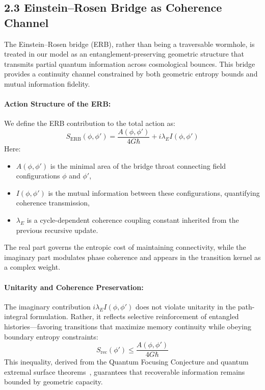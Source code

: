 \subsection*{2.3 Einstein–Rosen Bridge as Coherence Channel}

The Einstein–Rosen bridge (ERB), rather than being a traversable wormhole, is treated in our model as an entanglement-preserving geometric structure that transmits partial quantum information across cosmological bounces. This bridge provides a continuity channel constrained by both geometric entropy bounds and mutual information fidelity.

\paragraph{Action Structure of the ERB:}

We define the ERB contribution to the total action as:
\begin{equation}
S_{\text{ERB}}(\phi, \phi') = \frac{A(\phi, \phi')}{4G\hbar} + i \lambda_E I(\phi, \phi')
\end{equation}
Here:
\begin{itemize}
    \item \( A(\phi, \phi') \) is the minimal area of the bridge throat connecting field configurations \( \phi \) and \( \phi' \),
    \item \( I(\phi, \phi') \) is the mutual information between these configurations, quantifying coherence transmission,
    \item \( \lambda_E \) is a cycle-dependent coherence coupling constant inherited from the previous recursive update.
\end{itemize}

The real part governs the entropic cost of maintaining connectivity, while the imaginary part modulates phase coherence and appears in the transition kernel as a complex weight.

\paragraph{Unitarity and Coherence Preservation:}

The imaginary contribution \( i \lambda_E I(\phi, \phi') \) does not violate unitarity in the path-integral formulation. Rather, it reflects selective reinforcement of entangled histories—favoring transitions that maximize memory continuity while obeying boundary entropy constraints:
\[
S_{\text{rec}}(\phi') \leq \frac{A(\phi, \phi')}{4G\hbar}
\]
This inequality, derived from the Quantum Focusing Conjecture and quantum extremal surface theorems~\cite{engelhardt2015coarse, almheiri2019entropy}, guarantees that recoverable information remains bounded by geometric capacity.

